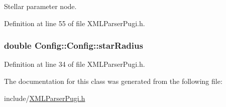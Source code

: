 Stellar parameter node. 



Definition at line 55 of file XMLParserPugi.h.

\hypertarget{classConfig_1_1Config_a2420c3fc48cec4f14644afb532ffcf39}{
\subsubsection[{starRadius}]{\setlength{\rightskip}{0pt plus 5cm}double {\bf Config::Config::starRadius}}}
\label{classConfig_1_1Config_a2420c3fc48cec4f14644afb532ffcf39}


Definition at line 34 of file XMLParserPugi.h.



The documentation for this class was generated from the following file:\begin{DoxyCompactItemize}
\item 
include/\hyperlink{XMLParserPugi_8h}{XMLParserPugi.h}\end{DoxyCompactItemize}
